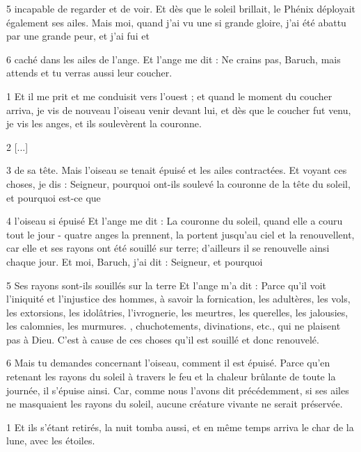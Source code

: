 \par 5 incapable de regarder et de voir. Et dès que le soleil brillait, le Phénix déployait également ses ailes. Mais moi, quand j'ai vu une si grande gloire, j'ai été abattu par une grande peur, et j'ai fui et

\par 6 caché dans les ailes de l'ange. Et l'ange me dit : Ne crains pas, Baruch, mais attends et tu verras aussi leur coucher.


\par 1 Et il me prit et me conduisit vers l'ouest ; et quand le moment du coucher arriva, je vis de nouveau l'oiseau venir devant lui, et dès que le coucher fut venu, je vis les anges, et ils soulevèrent la couronne.

\par 2 [...]

\par 3 de sa tête. Mais l’oiseau se tenait épuisé et les ailes contractées. Et voyant ces choses, je dis : Seigneur, pourquoi ont-ils soulevé la couronne de la tête du soleil, et pourquoi est-ce que

\par 4 l'oiseau si épuisé Et l'ange me dit : La couronne du soleil, quand elle a couru tout le jour - quatre anges la prennent, la portent jusqu'au ciel et la renouvellent, car elle et ses rayons ont été souillé sur terre; d'ailleurs il se renouvelle ainsi chaque jour. Et moi, Baruch, j'ai dit : Seigneur, et pourquoi

\par 5 Ses rayons sont-ils souillés sur la terre Et l'ange m'a dit : Parce qu'il voit l'iniquité et l'injustice des hommes, à savoir la fornication, les adultères, les vols, les extorsions, les idolâtries, l'ivrognerie, les meurtres, les querelles, les jalousies, les calomnies, les murmures. , chuchotements, divinations, etc., qui ne plaisent pas à Dieu. C'est à cause de ces choses qu'il est souillé et donc renouvelé.

\par 6 Mais tu demandes concernant l'oiseau, comment il est épuisé. Parce qu'en retenant les rayons du soleil à travers le feu et la chaleur brûlante de toute la journée, il s'épuise ainsi. Car, comme nous l'avons dit précédemment, si ses ailes ne masquaient les rayons du soleil, aucune créature vivante ne serait préservée.


\par 1 Et ils s'étant retirés, la nuit tomba aussi, et en même temps arriva le char de la lune, avec les étoiles.

